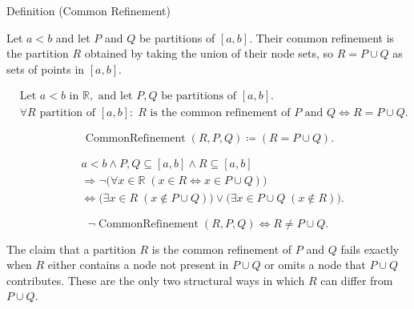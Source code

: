 \begin{definitionbox}{Definition (Common Refinement)}
\begin{definition}
\label{def:common-refinement}
Let $a<b$ and let $P$ and $Q$ be partitions of $[a,b]$. Their common refinement is the partition $R$ obtained by taking the union of their node sets, so $R = P \cup Q$ as sets of points in $[a,b]$.
\end{definition}
\end{definitionbox}

\begin{remark*}
\[
\begin{aligned}
&\text{Let } a<b \text{ in } \mathbb{R}, \text{ and let } P,Q \text{ be partitions of } [a,b].\\
&\forall R \text{ partition of } [a,b]:\;
R \text{ is the common refinement of } P \text{ and } Q
\Longleftrightarrow
R = P \cup Q.
\end{aligned}
\]
\end{remark*}

\begin{remark*}
\[
\operatorname{CommonRefinement}(R,P,Q) \coloneqq (R = P \cup Q).
\]
\end{remark*}

\begin{remark*}
\[
\begin{aligned}
&a<b\land P,Q\subseteq [a,b]\land R\subseteq [a,b]\\
&\Longrightarrow
\neg\bigl(\forall x\in\mathbb{R}\;(x\in R\Longleftrightarrow x\in P\cup Q)\bigr)\\
&\Longleftrightarrow
\bigl(\exists x\in R\;(x\notin P\cup Q)\bigr)
\lor
\bigl(\exists x\in P\cup Q\;(x\notin R)\bigr).
\end{aligned}
\]
\end{remark*}

\begin{remark*}
\[
\neg \operatorname{CommonRefinement}(R,P,Q) \Longleftrightarrow R \ne P \cup Q.
\]
\end{remark*}

\begin{remark*}
The claim that a partition $R$ is the common refinement of $P$ and $Q$ fails exactly when $R$ either contains a node not present in $P \cup Q$ or omits a node that $P \cup Q$ contributes. These are the only two structural ways in which $R$ can differ from $P \cup Q$.
\end{remark*}

